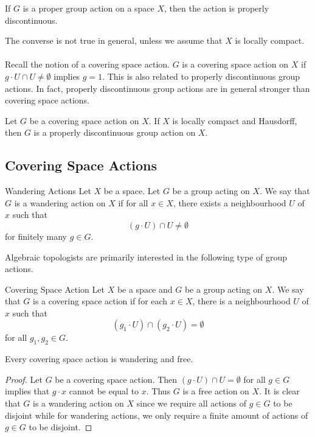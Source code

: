 \documentclass[a4paper]{article}
\begin{document}
\begin{prp}{}{} If $G$ is a proper group action on a space $X$, then the action is properly discontinuous. 
\end{prp}

The converse is not true in general, unless we assume that $X$ is locally compact. \\~\\

Recall the notion of a covering space action. $G$ is a covering space action on $X$ if $g\cdot U\cap U\neq\emptyset$ implies $g=1$. This is also related to properly discontinuous group actions. In fact, properly discontinuous group actions are in general stronger than covering space actions. 

\begin{prp}{}{} Let $G$ be a covering space action on $X$. If $X$ is locally compact and Hausdorff, then $G$ is a properly discontinuous group action on $X$. 
\end{prp}

\subsection{Covering Space Actions}
\begin{defn}{Wandering Actions}{} Let $X$ be a space. Let $G$ be a group acting on $X$. We say that $G$ is a wandering action on $X$ if for all $x\in X$, there exists a neighbourhood $U$ of $x$ such that $$(g\cdot U)\cap U\neq\emptyset$$ for finitely many $g\in G$. 
\end{defn}

Algebraic topologists are primarily interested in the following type of group actions. 

\begin{defn}{Covering Space Action}{} Let $X$ be a space and $G$ be a group acting on $X$. We say that $G$ is a covering space action if for each $x\in X$, there is a neighbourhood $U$ of $x$ such that $$(g_1\cdot U)\cap(g_2\cdot U)=\emptyset$$ for all $g_1,g_2\in G$. 
\end{defn}

\begin{lmm}{}{} Every covering space action is wandering and free. \tcbline
\begin{proof}
Let $G$ be a covering space action. Then $(g\cdot U)\cap U=\emptyset$ for all $g\in G$ implies that $g\cdot x$ cannot be equal to $x$. Thus $G$ is a free action on $X$. It is clear that $G$ is a wandering action on $X$ since we require all actions of $g\in G$ to be disjoint while for wandering actions, we only require a finite amount of actions of $g\in G$ to be disjoint. 
\end{proof}
\end{lmm}
\end{document}

